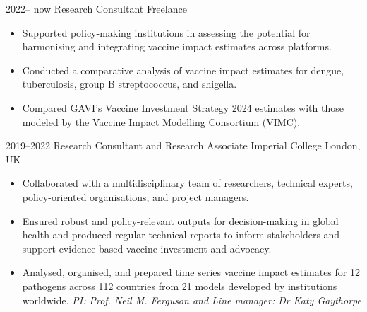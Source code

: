 \documentclass[icon]{twentysecondcv}
\begin{document}
\begin{twenty} %


 \twentyitem
    	{2022-- now}
    	{Research Consultant}
	{Freelance}
        	{\small \begin{itemize}
        	 \item Supported policy-making institutions in assessing the potential for harmonising and integrating vaccine impact estimates across platforms.
  \item Conducted a comparative analysis of vaccine impact estimates for dengue, tuberculosis, group B streptococcus, and shigella.
  \item Compared GAVI’s Vaccine Investment Strategy 2024 estimates with those modeled by the Vaccine Impact Modelling Consortium (VIMC).
 
\end{itemize}}
        	
        	
	
 \twentyitem
       {2019--2022}
       {Research Consultant and Research Associate}
       {Imperial College London, UK}
       {\small  \begin{itemize}
       
  \item Collaborated with a multidisciplinary team of researchers, technical experts, policy-oriented organisations, and project managers.
  \item Ensured robust and policy-relevant outputs for decision-making in global health and produced regular technical reports to inform stakeholders and support evidence-based vaccine investment and advocacy.
  \item Analysed, organised, and prepared time series vaccine impact estimates for 12 pathogens across 112 countries from 21 models developed by institutions worldwide. \textit{ PI: Prof. Neil M. Ferguson and Line manager: Dr Katy Gaythorpe}


\end{itemize}}
\end{twenty}
\end{document}
